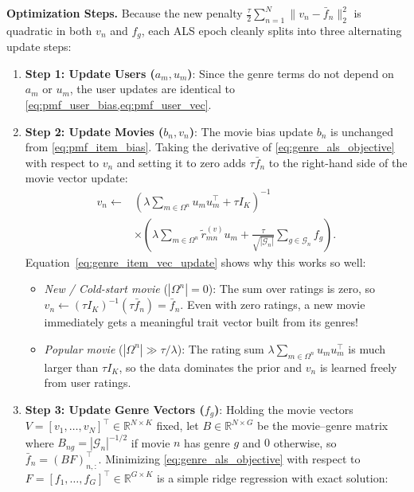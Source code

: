 \documentclass{article}
\theoremstyle{plain}
\theoremstyle{definition}
\begin{document}
\textbf{Optimization Steps.} Because the new penalty $\frac{\tau}{2} \sum_{n=1}^N \|v_n - \bar{f}_n\|_2^2$ is quadratic in both $v_n$ and $f_g$, each ALS epoch cleanly splits into three alternating update steps:
\begin{enumerate}
    \item \textbf{Step 1: Update Users ($a_m, u_m$)}: Since the genre terms do not depend on $a_m$ or $u_m$, the user updates are identical to \cref{eq:pmf_user_bias,eq:pmf_user_vec}.
    \item \textbf{Step 2: Update Movies ($b_n, v_n$)}: The movie bias update $b_n$ is unchanged from \cref{eq:pmf_item_bias}. Taking the derivative of \cref{eq:genre_als_objective} with respect to $v_n$ and setting it to zero adds $\tau \bar{f}_n$ to the right-hand side of the movie vector update:
    \begin{equation}
    \begin{aligned}
    v_n \leftarrow &\left( \lambda \sum_{m \in \Omega^n} u_m u_m^\top + \tau I_K \right)^{-1} \\
    &\times \left( \lambda \sum_{m \in \Omega^n} \tilde{r}_{mn}^{(v)} u_m + \frac{\tau}{\sqrt{|\mathcal{G}_n|}} \sum_{g \in \mathcal{G}_n} f_g \right).
    \end{aligned}
    \label{eq:genre_item_vec_update}
    \end{equation}
    Equation~\eqref{eq:genre_item_vec_update} shows why this works so well:
    \begin{itemize}
        \item \emph{New / Cold-start movie} ($|\Omega^n| = 0$): The sum over ratings is zero, so $v_n \leftarrow (\tau I_K)^{-1} (\tau \bar{f}_n) = \bar{f}_n$. Even with zero ratings, a new movie immediately gets a meaningful trait vector built from its genres!
        \item \emph{Popular movie} ($|\Omega^n| \gg \tau / \lambda$): The rating sum $\lambda \sum_{m \in \Omega^n} u_m u_m^\top$ is much larger than $\tau I_K$, so the data dominates the prior and $v_n$ is learned freely from user ratings.
    \end{itemize}
    \item \textbf{Step 3: Update Genre Vectors ($f_g$)}: Holding the movie vectors $V = [v_1, \dots, v_N]^\top \in \mathbb{R}^{N \times K}$ fixed, let $B \in \mathbb{R}^{N \times G}$ be the movie--genre matrix where $B_{ng} = |\mathcal{G}_n|^{-1/2}$ if movie $n$ has genre $g$ and $0$ otherwise, so $\bar{f}_n = (B F)_{n,:}^\top$. Minimizing \cref{eq:genre_als_objective} with respect to $F = [f_1, \dots, f_G]^\top \in \mathbb{R}^{G \times K}$ is a simple ridge regression with exact solution:

\end{enumerate}
\end{document}
